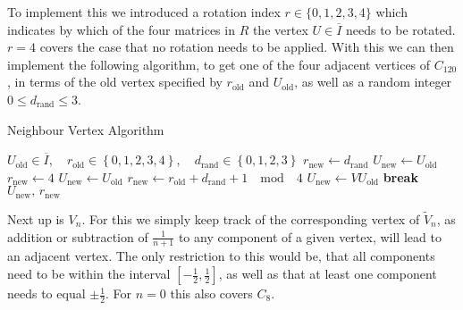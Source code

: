 To implement this we introduced a rotation index $r \in \{0,1,2,3,4\}$ which indicates by which of the four matrices in $R$ the vertex $U \in \overline{I}$ needs to be rotated. $r=4$ covers the case that no rotation needs to be applied. With this we can then implement the following algorithm, to get one of the four adjacent vertices of $C_{120}$, in terms of the old vertex specified by $r_{\textrm{old}}$ and $U_{\textrm{old}}$, as well as a random integer $0 \le d_{\textrm{rand}} \le 3$.
\begin{algorithm}[!htb]
 \caption{Neighbour Vertex Algorithm}
 \label{alg:120CellVertexPick}
 \begin{algorithmic}[1]
  \REQUIRE $U_{\textrm{old}} \in \overline{I}, \quad r_{\textrm{old}}\in \left\{ 0,1,2,3,4\right\}, \quad d_{\textrm{rand}} \in \left\{0,1,2,3 \right\}$
  \STATE $r_{\textrm{new}} \leftarrow d_{\textrm{rand}}$
  \STATE $U_{\textrm{new}} \leftarrow U_{\textrm{old}}$
  \STATE $r_{\textrm{new}} \leftarrow 4$
  \STATE $U_{\textrm{new}} \leftarrow U_{\textrm{old}}$
  \ELSE
  \STATE $r_{\textrm{new}} \leftarrow r_{\textrm{old}} + d_{\textrm{rand}} + 1 \quad \mathrm{mod} \quad 4$
  \STATE $U_{\textrm{new}} \leftarrow V U_{\textrm{old}}$
  \STATE \textbf{break}
  \ENDIF
  \ENDFOR
  \ENDIF
  \RETURN $U_{\textrm{new}}, \, r_{\textrm{new}}$
 \end{algorithmic}
\end{algorithm}

Next up is $V_n$. For this we simply keep track of the corresponding vertex of $\tilde{V}_n$, as addition or subtraction of $\frac{1}{n+1}$ to any component of a given vertex, will lead to an adjacent vertex. The only restriction to this would be, that all components need to be within the interval $\left[-\frac{1}{2},\frac{1}{2}\right]$, as well as that at least one component needs to equal $\pm \frac{1}{2}$. For $n = 0$ this also covers $C_8$.\\


